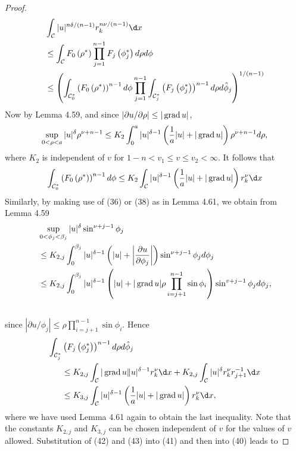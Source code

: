 \begin{proof}
  \[
  \begin{aligned}
  & \int_{\mathcal{C}}|u|^{n \delta /(n-1)} r_k^{n \nu /(n-1)} \d x \\
  & \leq \int_{\mathcal{C}} F_0\left(\rho^*\right) \prod_{j=1}^{n-1} F_j\left(\phi_j^*\right) d \rho d \phi \\
  & \leq\left(\int_{\mathcal{C}_0^*}\left(F_0\left(\rho^*\right)\right)^{n-1} d \phi \prod_{j=1}^{n-1} \int_{\mathcal{C}_j^*}\left(F_j\left(\phi_j^*\right)\right)^{n-1} d \rho d \hat{\phi}_j\right)^{1 /(n-1)}
  \end{aligned}
  \]
  Now by Lemma 4.59, and since $|\partial u / \partial \rho| \leq|\operatorname{grad} u|$,
  \[
  \sup _{0<\rho<a}|u|^\delta \rho^{\nu+n-1} \leq K_2 \int_0^a|u|^{\delta-1}\left(\frac{1}{a}|u|+|\operatorname{grad} u|\right) \rho^{\nu+n-1} d \rho,
  \]
  where $K_2$ is independent of $v$ for $1-n<v_1 \leq v \leq v_2<\infty$. It follows that
  \[
  \int_{\mathcal{C}_0^*}\left(F_0\left(\rho^*\right)\right)^{n-1} d \phi \leq K_2 \int_{\mathcal{C}}|u|^{\delta-1}\left(\frac{1}{a}|u|+|\grad u|\right) r_k^\nu \d x
  \]
  Similarly, by making use of (36) or (38) as in Lemma 4.61, we obtain from Lemma 4.59
  \[
  \begin{aligned}
  & \sup _{0<\phi_j<\beta_j}|u|^\delta \sin ^{\nu+j-1} \phi_j \\
  & \leq K_{2, j} \int_0^{\beta_j}|u|^{\delta-1}\left(|u|+\left|\frac{\partial u}{\partial \phi_j}\right|\right) \sin ^{\nu+j-1} \phi_j d \phi_j \\
  & \leq K_{2, j} \int_0^{\beta_j}|u|^{\delta-1}\left(|u|+|\operatorname{grad} u| \rho \prod_{i=j+1}^{n-1} \sin \phi_i\right) \sin ^{v+j-1} \phi_j d \phi_j, \\
  &
  \end{aligned}
  \]
  since $\left|\partial u / \phi_j\right| \leq \rho \prod_{i=j+1}^{n-1} \sin \phi_i$. Hence
  \[
  \begin{aligned}
  \int_{\mathcal{C}_j^*} & \left(F_j\left(\phi_j^*\right)\right)^{n-1} d \rho d \hat{\phi}_j \\
  & \leq K_{2, j} \int_{\mathcal{C}}|\grad u \| u|^{\delta-1} r_k^\nu \d x+K_{2, j} \int_{\mathcal{C}}|u|^\delta r_k^\nu r_{j+1}^{-1} \d x \\
  & \leq K_{3, j} \int_{\mathcal{C}}|u|^{\delta-1}\left(\frac{1}{a}|u|+|\grad u|\right) r_k^\nu \d x,
  \end{aligned}
  \]
  where we have used Lemma 4.61 again to obtain the last inequality. Note that the constants $K_{2, j}$ and $K_{3, j}$ can be chosen independent of $v$ for the values of $v$ allowed. Substitution of (42) and (43) into (41) and then into (40) leads to

\end{proof}
